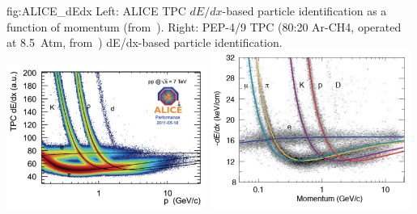 \begin{dunefigure}{fig:ALICE_dEdx}
{Left: ALICE TPC $dE/dx$-based particle identification as a function of momentum (from~\cite{ALICE_Lippmann}). Right: PEP-4/9 TPC (80:20 Ar-CH4, operated at 8.5~Atm, from~\cite{Grupen:1999by}) dE/dx-based particle identification.}
\includegraphics[width=0.49\textwidth]{graphics/ALICE_TPC_dEdx_Lippmann_2012.png}
\includegraphics[width=0.49\textwidth]{graphics/PEP4-TPC-80Ar-20CH4-8_5atm_dEdx.png} 
\end{dunefigure}

